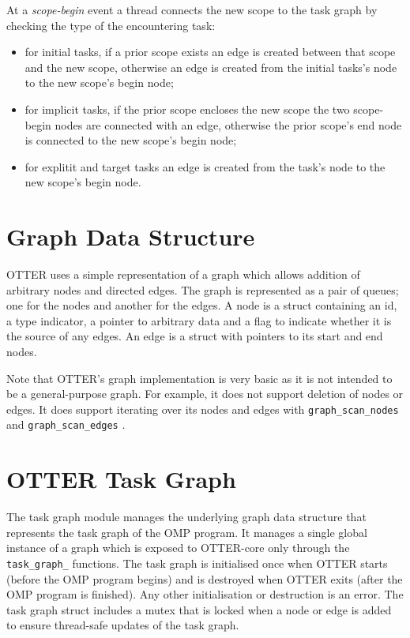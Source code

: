 \documentclass[11pt,a4paper]{article}
\newcommand{\code}[1]{\texttt{#1} }
\begin{document}
At a \emph{scope-begin} event a thread connects the new scope to the task graph by checking the type of the encountering task:

\begin{itemize}
\item for initial tasks, if a prior scope exists an edge is created between that scope and the new scope, otherwise an edge is created from the initial tasks's node to the new scope's begin node;
\item for implicit tasks, if the prior scope encloses the new scope the two scope-begin nodes are connected with an edge, otherwise the prior scope's end node is connected to the new scope's begin node;
\item for explitit and target tasks an edge is created from the task's node to the new scope's begin node.
\end{itemize}

\section{Graph Data Structure}

OTTER uses a simple representation of a graph which allows addition of arbitrary nodes and directed edges. The graph is represented as a pair of queues; one for the nodes and another for the edges. A node is a struct containing an id, a type indicator, a pointer to arbitrary data and a flag to indicate whether it is the source of any edges. An edge is a struct with pointers to its start and end nodes.

Note that OTTER's graph implementation is very basic as it is not intended to be a general-purpose graph. For example, it does not support deletion of nodes or edges. It does support iterating over its nodes and edges with \code{graph\_scan\_nodes} and \code{graph\_scan\_edges}.

\section{OTTER Task Graph}

The task graph module manages the underlying graph data structure that represents the task graph of the OMP program. It manages a single global instance of a graph which is exposed to OTTER-core only through the \code{task\_graph\_} functions. The task graph is initialised once when OTTER starts (before the OMP program begins) and is destroyed when OTTER exits (after the OMP program is finished). Any other initialisation or destruction is an error. The task graph struct includes a mutex that is locked when a node or edge is added to ensure thread-safe updates of the task graph.
\end{document}
